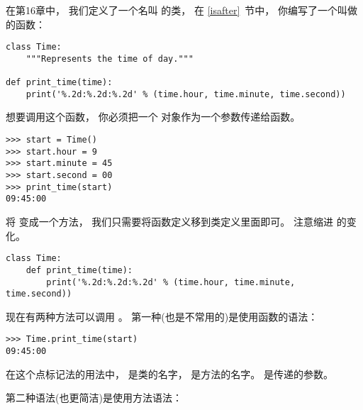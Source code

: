 在第16章中， 我们定义了一个名叫  的类，  在 \ref{isafter}~节中，
你编写了一个叫做  的函数：

\begin{lstlisting}
class Time:
    """Represents the time of day."""

def print_time(time):
    print('%.2d:%.2d:%.2d' % (time.hour, time.minute, time.second))
\end{lstlisting}


想要调用这个函数， 你必须把一个  对象作为一个参数传递给函数。

\begin{lstlisting}
>>> start = Time()
>>> start.hour = 9
>>> start.minute = 45
>>> start.second = 00
>>> print_time(start)
09:45:00
\end{lstlisting}


将  变成一个方法， 我们只需要将函数定义移到类定义里面即可。  注意缩进
的变化。
  

\begin{lstlisting}
class Time:
    def print_time(time):
        print('%.2d:%.2d:%.2d' % (time.hour, time.minute, time.second))
\end{lstlisting}


现在有两种方法可以调用 。   第一种(也是不常用的)是使用函数的语法：
  

\begin{lstlisting}
>>> Time.print_time(start)
09:45:00
\end{lstlisting}


在这个点标记法的用法中，   是类的名字，  是方法的名字。
 是传递的参数。

第二种语法(也更简洁)是使用方法语法：

